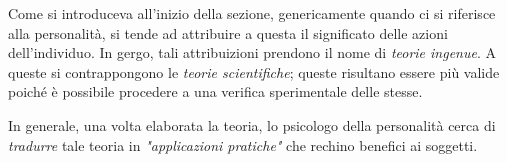 \documentclass{subfiles}
\begin{document}
Come si introduceva all'inizio della sezione, genericamente quando ci si riferisce alla personalità,
si tende ad attribuire a questa il significato delle azioni dell'individuo.
In gergo, tali attribuizioni prendono il nome di \emph{teorie ingenue}.
A queste si contrappongono le \emph{teorie scientifiche}; queste risultano essere più valide poiché è possibile procedere a una verifica sperimentale delle stesse.

In generale, una volta elaborata la teoria, lo psicologo della personalità cerca di \textit{tradurre} tale teoria in \textit{"applicazioni pratiche"}
che rechino benefici ai soggetti.
\clearpage
\end{document}
